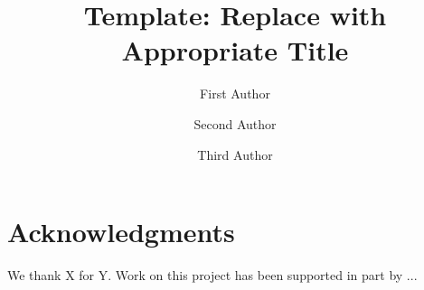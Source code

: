 \documentclass{llncs}
\begin{document}
\title{Template: Replace with Appropriate Title}

\author{First Author \and Second Author \and Third Author}
%

\maketitle

\begin{abstract}

\end{abstract}

 
 
 
 
 
 
 


\section{Acknowledgments}

We thank X for Y. 
Work on this project has been supported in part by ...


  
\end{document}
